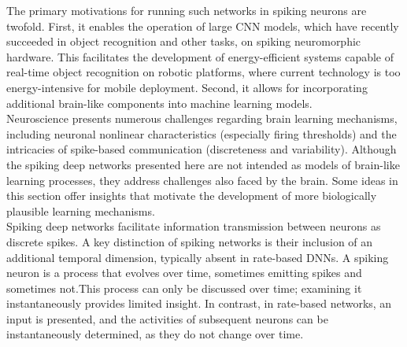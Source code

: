 \noindent The primary motivations for running such networks in spiking neurons are twofold. First, it enables the operation of large CNN models, which have recently succeeded in object recognition and other tasks, on spiking neuromorphic hardware. This facilitates the development of energy-efficient systems capable of real-time object recognition on robotic platforms, where current technology is too energy-intensive for mobile deployment. Second, it allows for incorporating additional brain-like components into machine learning models. \\

\noindent Neuroscience presents numerous challenges regarding brain learning mechanisms, including neuronal nonlinear characteristics (especially firing thresholds) and the intricacies of spike-based communication (discreteness and variability). Although the spiking deep networks presented here are not intended as models of brain-like learning processes, they address challenges also faced by the brain. Some ideas in this section offer insights that motivate the development of more biologically plausible learning mechanisms.\\




\noindent Spiking deep networks facilitate information transmission between neurons as discrete spikes. A key distinction of spiking networks is their inclusion of an additional temporal dimension, typically absent in rate-based DNNs. A spiking neuron is a process that evolves over time, sometimes emitting spikes and sometimes not.This process can only be discussed over time; examining it instantaneously provides limited insight. In contrast, in rate-based networks, an input is presented, and the activities of subsequent neurons can be instantaneously determined, as they do not change over time.\\

